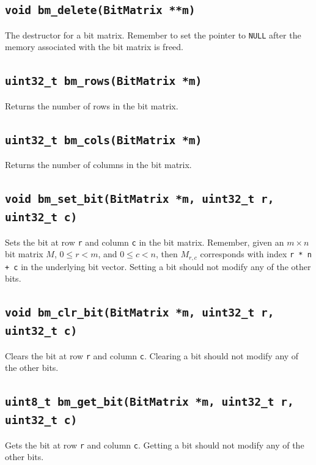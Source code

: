 \documentclass[11pt]{article}
\begin{document}
\subsection{\texttt{void bm\_delete(BitMatrix **m)}}

The destructor for a bit matrix. Remember to set the pointer to
\texttt{NULL} after the memory associated with the bit matrix is freed.

\subsection{\texttt{uint32\_t bm\_rows(BitMatrix *m)}}

Returns the number of rows in the bit matrix.

\subsection{\texttt{uint32\_t bm\_cols(BitMatrix *m)}}

Returns the number of columns in the bit matrix.

\subsection{\texttt{void bm\_set\_bit(BitMatrix *m, uint32\_t r, uint32\_t c)}}

Sets the bit at row \texttt{r} and column \texttt{c} in the bit matrix.
Remember, given an $m \times n$ bit matrix $M$, $0 \leq r < m$, and $0
\leq c < n$, then $M_{r, c}$ corresponds with index \texttt{r * n + c}
in the underlying bit vector. Setting a bit should not modify any of the
other bits.

\subsection{\texttt{void bm\_clr\_bit(BitMatrix *m, uint32\_t r,
uint32\_t c)}}

Clears the bit at row \texttt{r} and column \texttt{c}. Clearing a bit
should not modify any of the other bits.

\subsection{\texttt{uint8\_t bm\_get\_bit(BitMatrix *m, uint32\_t r, uint32\_t c)}}

Gets the bit at row \texttt{r} and column \texttt{c}. Getting a bit
should not modify any of the other bits.
\end{document}
